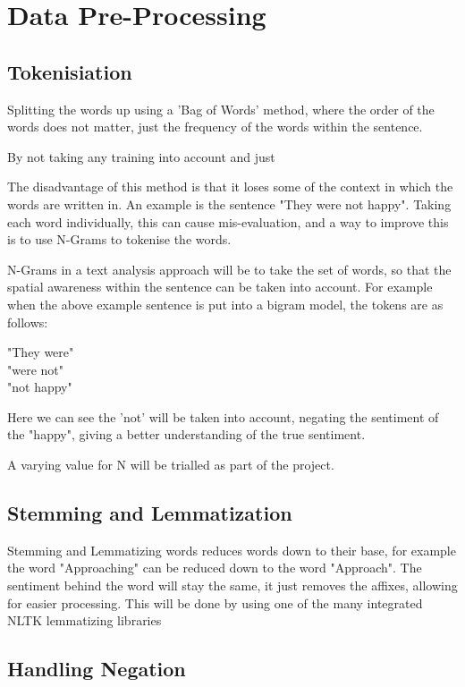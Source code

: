 \section{Data Pre-Processing}

\subsection{Tokenisiation}

Splitting the words up using a 'Bag of Words' method, where the order of the words does not matter, just the frequency of the words within the sentence.

By not taking any training into account and just

The disadvantage of this method is that it loses some of the context in which the words are written in. An example is the sentence "They were not happy". Taking each word individually, this can cause mis-evaluation, and a way to improve this is to use N-Grams to tokenise the words. 

N-Grams in a text analysis approach will be to take the set of words, so that the spatial awareness within the sentence can be taken into account. For example when the above example sentence is put into a bigram model, the tokens are as follows:

\begin{center}
"They were" \\
"were not"\\
"not happy"\\
\end{center}

Here we can see the 'not' will be taken into account, negating the sentiment of the "happy", giving a better understanding of the true sentiment.

A varying value for N will be trialled as part of the project.

\subsection{Stemming and Lemmatization}

Stemming and Lemmatizing words reduces words down to their base, for example the word "Approaching" can be reduced down to the word "Approach". The sentiment behind the word will stay the same, it just removes the affixes, allowing for easier processing. This will be done by using one of the many integrated NLTK lemmatizing libraries \cite{lemmatizing}

\subsection{Handling Negation}

